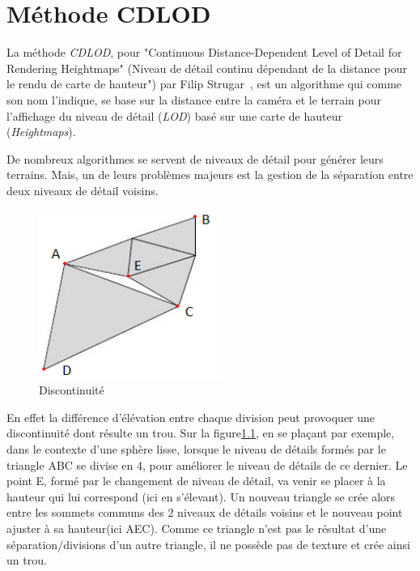 \chapter{Méthode CDLOD}
  \label{chap:cdlod}

  La méthode \emph{CDLOD}, pour "Continuous Distance-Dependent Level of Detail for Rendering Heightmaps" (Niveau de détail continu dépendant de la distance pour le rendu de carte de hauteur") par Filip Strugar~\cite{CDLOD}, 
  est un algorithme qui comme son nom l'indique, se base sur la distance entre la caméra et le terrain pour l'affichage du niveau de détail 
  (\textit{LOD}) basé sur une carte de hauteur (\emph{Heightmaps}).

  De nombreux algorithmes se servent de niveaux de détail pour générer leurs terrains. Mais, un de leurs problèmes majeurs est la gestion de la séparation entre deux niveaux de détail voisins.
  
 \begin{figure}
 \includegraphics[width=6cm]{img/cracks.png}
   \caption[Discontinuité]{Discontinuité\protect\footnotemark}
   \label{fig:cracks}
 \end{figure}
 
 \vspace{0.1cm}
 En effet la différence d'élévation entre chaque division peut provoquer une discontinuité dont résulte un trou. Sur la figure\ref{fig:cracks}, en se plaçant par exemple, dans le contexte d'une sphère lisse, lorsque le niveau de détails formés par le triangle ABC se divise en 4, pour améliorer le niveau de détails de ce dernier. Le point E, formé par le changement de niveau de détail, va venir se placer à la hauteur qui lui correspond (ici en s'élevant). Un nouveau triangle se crée alors entre les sommets communs des 2 niveaux de détails voisins et le nouveau point ajuster à sa hauteur(ici AEC). Comme ce triangle n'est pas le résultat d'une séparation/divisions d'un autre triangle, il ne possède pas de texture et crée ainsi un trou.\\
 
